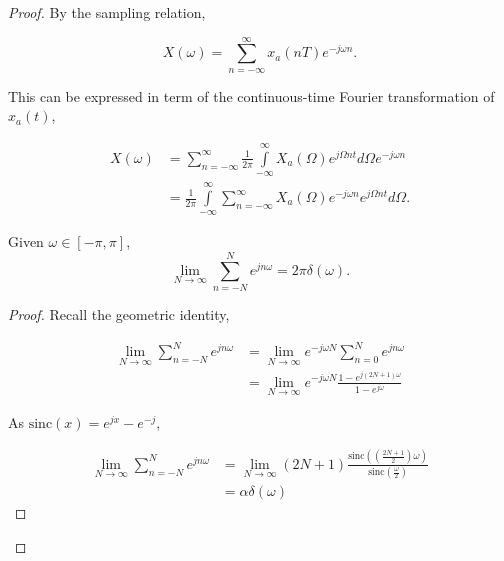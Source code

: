\begin{proof}
By the sampling relation,  

\begin{equation}
X\left( \omega  \right) = \sum\limits_{n =  - \infty }^\infty  {{x_a}(nT){e^{ - j\omega n}}} .
\end{equation}

This can be expressed in term of the continuous-time Fourier transformation of $x_a(t)$,

\begin{equation}
\begin{aligned}
X\left( \omega  \right) &= \sum\limits_{n =  - \infty }^\infty  {\frac{1}{{2\pi }}\int\limits_{ - \infty }^\infty  {{X_a}(\Omega ){e^{j\Omega nt}}d\Omega } {e^{ - j\omega n}}} \\
 &= \frac{1}{{2\pi }}\int\limits_{ - \infty }^\infty  {\sum\limits_{n =  - \infty }^\infty  {{X_a}\left( \Omega  \right)} {e^{ - j\omega n}}{e^{j\Omega nt}}d\Omega } .
\end{aligned}
\end{equation}

\begin{lemma} \label{comb}
Given $\omega \in [-\pi, \pi]$, 
\begin{equation}
\mathop {\lim }\limits_{N \to \infty } \sum\limits_{n =  - N}^N {{e^{jn\omega }}}  = 2\pi \delta \left( \omega  \right).
\end{equation}
\end{lemma}

\begin{proof}
Recall the geometric identity,

\begin{equation}
\begin{aligned}
\mathop {\lim }\limits_{N \to \infty } \sum\limits_{n =  - N}^N {{e^{jn\omega }}}  &= \mathop {\lim }\limits_{N \to \infty } {e^{ - j\omega N}}\sum\limits_{n = 0}^N {{e^{jn\omega }}} \\
 &= \mathop {\lim }\limits_{N \to \infty } {e^{ - j\omega N}}\frac{{1 - {e^{j\left( {2N + 1} \right)\omega }}}}{{1 - {e^{j\omega }}}}
\end{aligned}
\end{equation}

As $\text{sinc}(x) = e^{jx} - e^{-j}$,

\begin{equation}
\begin{aligned}
\mathop {\lim }\limits_{N \to \infty } \sum\limits_{n =  - N}^N {{e^{jn\omega }}}  &= \mathop {\lim }\limits_{N \to \infty } \left( {2N + 1} \right)\frac{{\text{sinc} \left( {\left( {\frac{{2N + 1}}{2}} \right)\omega } \right)}}{{\text{sinc} \left( {\frac{\omega }{2}} \right)}} \\
&= \alpha \delta(\omega)
\end{aligned}
\end{equation}


\end{proof}
\end{proof}
